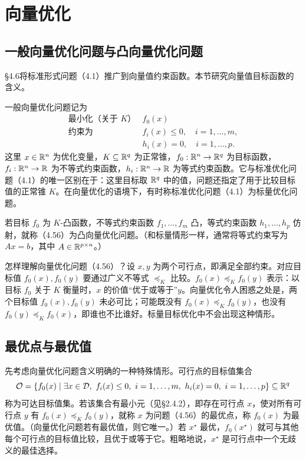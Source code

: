 \section{向量优化}
\subsection{一般向量优化问题与凸向量优化问题}
§4.6将标准形式问题（4.1）推广到向量值约束函数。本节研究向量值目标函数的含义。

一般向量优化问题记为
\begin{equation}
\begin{array}{ll}\text{最小化（关于 }K\text{）}&f_0(x)\\\text{约束为}&f_i(x)\le0,\quad i=1,\ldots,m,\\&h_i(x)=0,\quad i=1,\ldots,p.\end{array}\tag{4.56}
\end{equation}
这里 $x\in\mathbb R^n$ 为优化变量，$K\subseteq\mathbb R^q$ 为正常锥，$f_0:\mathbb R^n\to\mathbb R^q$ 为目标函数，$f_i:\mathbb R^n\to\mathbb R$ 为不等式约束函数，$h_i:\mathbb R^n\to\mathbb R$ 为等式约束函数。它与标准优化问题（4.1）的唯一区别在于：这里目标取 $\mathbb R^q$ 中的值，问题还指定了用于比较目标值的正常锥 $K$。在向量优化的语境下，有时称标准优化问题（4.1）为标量优化问题。

若目标 $f_0$ 为 $K$-凸函数，不等式约束函数 $f_1,\ldots,f_m$ 凸，等式约束函数 $h_1,\ldots,h_p$ 仿射，就称（4.56）为凸向量优化问题。（和标量情形一样，通常将等式约束写为 $Ax=b$，其中 $A\in\mathbb R^{p\times n}$。）

怎样理解向量优化问题（4.56）？设 $x,y$ 为两个可行点，即满足全部约束。对应目标值 $f_0(x),f_0(y)$ 要通过广义不等式 $\preceq_K$ 比较。$f_0(x)\preceq_K f_0(y)$ 表示：以目标 $f_0$ 关于 $K$ 衡量时，$x$ 的价值“优于或等于”$y$。向量优化令人困惑之处是，两个目标值 $f_0(x),f_0(y)$ 未必可比；可能既没有 $f_0(x)\preceq_K f_0(y)$，也没有 $f_0(y)\preceq_K f_0(x)$，即谁也不比谁好。标量目标优化中不会出现这种情形。

\subsection{最优点与最优值}
先考虑向量优化问题含义明确的一种特殊情形。可行点的目标值集合
\[
\mathcal O=\{f_0(x)\mid\exists x\in\mathcal D,\ f_i(x)\le0,\ i=1,\ldots,m,\ h_i(x)=0,\ i=1,\ldots,p\}\subseteq\R^q
\]
称为可达目标值集。若该集合有最小元（见§2.4.2），即存在可行点 $x$，使对所有可行点 $y$ 有 $f_0(x)\preceq_K f_0(y)$，就称 $x$ 为问题（4.56）的最优点，称 $f_0(x)$ 为最优值。（向量优化问题若有最优值，则它唯一。）若 $x^\star$ 最优，$f_0(x^\star)$ 就可与其他每个可行点的目标值比较，且优于或等于它。粗略地说，$x^\star$ 是可行点中一个无歧义的最佳选择。


